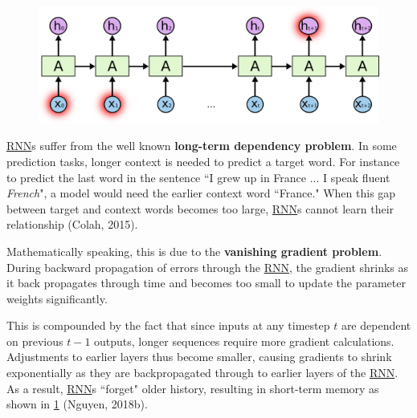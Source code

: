 {
\begin{figure}
\begin{center}
    \vspace{-20pt}
    \includegraphics[width=\linewidth]{imgs/rnn_longterm.png}
\end{center}
\vspace{-15pt}
\label{fig:longTermMemoryProblem}
\end{figure}


\hyperref[sec:RNN]{RNN}s suffer from the well known \textbf{long-term dependency problem}. In some prediction tasks, longer context is needed to predict a target word. For instance to predict the last word in the sentence ``I grew up in France ... I speak fluent \emph{French}", a model would need the earlier context word ``France." When this gap between target and context words becomes too large, \hyperref[sec:RNN]{RNN}s cannot learn their relationship (Colah, 2015). 

Mathematically speaking, this is due to the \textbf{vanishing gradient problem}. During backward propagation of errors through the \hyperref[sec:RNN]{RNN}, the gradient shrinks as it back propagates through time and becomes too small to update the parameter weights significantly. 


}

This is compounded by the fact that since inputs at any timestep $t$ are dependent on previous $t-1$ outputs, longer sequences require more gradient calculations. Adjustments to earlier layers thus become smaller, causing gradients to shrink exponentially as they are backpropagated through to earlier layers of the \hyperref[sec:RNN]{RNN}. As a result, \hyperref[sec:RNN]{RNN}s ``forget" older history, resulting in short-term memory as shown in \cref{fig:longTermMemoryProblem} (Nguyen, 2018b). 



